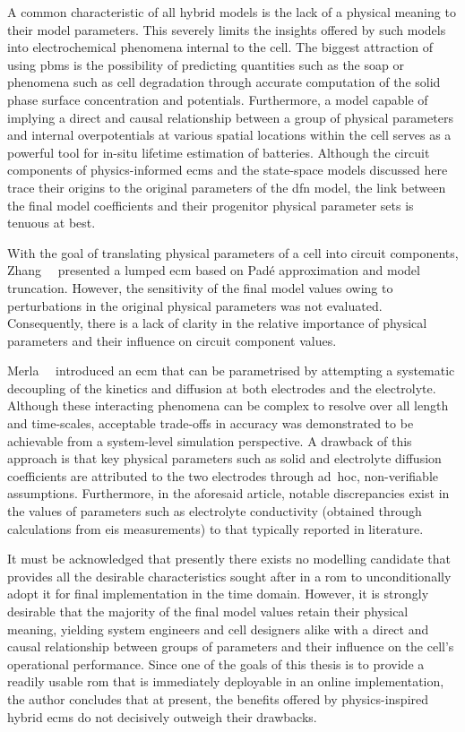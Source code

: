 A  common  characteristic  of all  hybrid  models  is  the  lack of  a  physical
meaning to  their model  parameters. This severely  limits the  insights offered
by  such  models  into  electrochemical  phenomena internal  to  the  cell.  The
biggest  attraction  of  using  \glspl{pbm} is  the  possibility  of  predicting
quantities such as the \gls{soap} or  phenomena such as cell degradation through
accurate computation  of the solid  phase surface concentration  and potentials.
Furthermore,  a model  capable  of  implying a  direct  and causal  relationship
between a  group of physical  parameters and internal overpotentials  at various
spatial locations within the cell serves as a powerful tool for in-situ lifetime
estimation  of batteries.  Although the  circuit components  of physics-informed
\glspl{ecm} and the state-space models discussed here trace their origins to the
original parameters  of the \gls{dfn}  model, the  link between the  final model
coefficients and their progenitor physical parameter sets is tenuous at best.


With  the  goal of  translating  physical  parameters  of  a cell  into  circuit
components, Zhang~\etal{}~\cite{Zhang2017} presented a lumped \gls{ecm} based on
Padé approximation and  model truncation. However, the sensitivity  of the final
model values owing to perturbations in  the original physical parameters was not
evaluated. Consequently, there  is a lack of clarity in  the relative importance
of physical parameters and their influence on circuit component values.


Merla~\etal{}~\cite{Merla2018} introduced an \gls{ecm}  that can be parametrised
by attempting  a systematic  decoupling of  the kinetics  and diffusion  at both
electrodes  and the  electrolyte. Although  these interacting  phenomena can  be
complex to  resolve over  all length and  time-scales, acceptable  trade-offs in
accuracy  was  demonstrated to  be  achievable  from a  system-level  simulation
perspective. A  drawback of this approach  is that key physical  parameters such
as  solid and  electrolyte  diffusion  coefficients are  attributed  to the  two
electrodes  through  \mbox{ad hoc},  non-verifiable assumptions.  Furthermore,  in  the
aforesaid article, notable discrepancies exist  in the values of parameters such
as  electrolyte  conductivity  (obtained  through  calculations  from  \gls{eis}
measurements) to that typically reported in literature.

It must be acknowledged that presently  there exists no modelling candidate that
provides  all the  desirable  characteristics  sought after  in  a \gls{rom}  to
unconditionally adopt it  for final implementation in the  time domain. However,
it is  strongly desirable  that the  majority of the  final model  values retain
their physical meaning, yielding system  engineers and cell designers alike with
a  direct  and  causal  relationship  between groups  of  parameters  and  their
influence on the cell's operational performance.  Since one of the goals of this
thesis is to  provide a readily usable \gls{rom} that  is immediately deployable
in an online implementation, the author  concludes that at present, the benefits
offered by physics-inspired hybrid \glspl{ecm}  do not decisively outweigh their
drawbacks.

